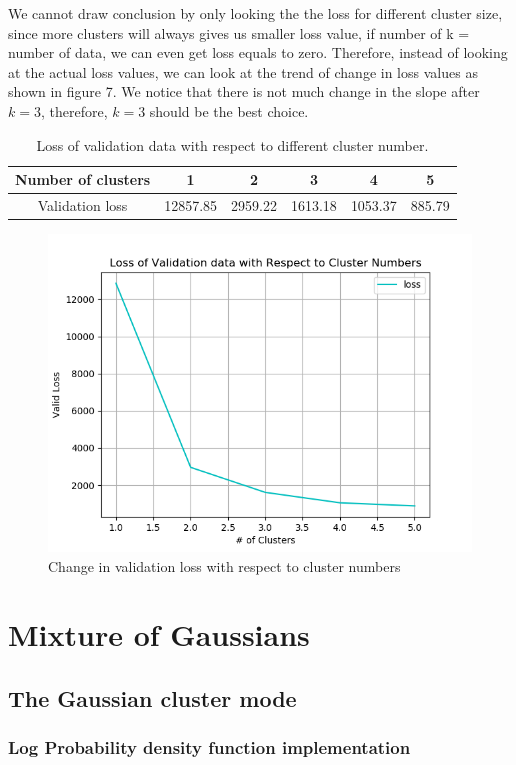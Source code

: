 \documentclass[10pt,letterpaper]{article}
\begin{document}
\qquad We cannot draw conclusion by only looking the the loss for different cluster size, since more clusters will always gives us smaller loss value, if number of k = number of data, we can even get loss equals to zero. Therefore, instead of looking at the actual loss values, we can look at the trend of change in loss values as shown in figure 7. We notice that there is not much change in the slope after $k=3$, therefore, $k=3$ should be the best choice.\\
\begin{table}[H]
\centering
{\small

\begin{tabular}{cccccc}
\hline
Number of clusters & 1  & 2 & 3 & 4 & 5\\ \hline
Validation loss & 12857.85 & 2959.22 & 1613.18 & 1053.37 & 885.79\\ 
\hline
\end{tabular}
}
\vspace{-0.2cm}
\caption{Loss of validation data with respect to different cluster number.}
\label{tab:Number of hidden units}
\vspace{-0.4cm}
\end{table}

\begin{figure}[H]
\centering

  \includegraphics[width=.45\linewidth]{imgs/clusterNew.png}\hfill
  \caption{Change in validation loss with respect to cluster numbers}
  
\end{figure}





\section{Mixture of Gaussians} 
\subsection{The Gaussian cluster mode}
\subsubsection{Log Probability density function implementation}
\end{document}
